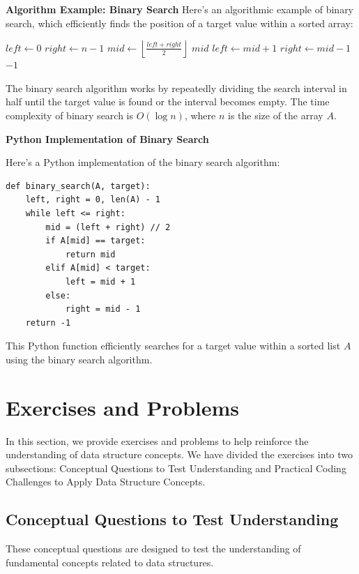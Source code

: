 \documentclass[12pt]{book} %
\begin{document}
\FloatBarrier
\textbf{Algorithm Example: Binary Search}
Here's an algorithmic example of binary search, which efficiently finds the position of a target value within a sorted array:
\FloatBarrier
\begin{algorithm}[H]
\caption{Binary Search}
\begin{algorithmic}[1]
    \State $left \gets 0$
    \State $right \gets n - 1$
        \State $mid \gets \left\lfloor \frac{left + right}{2} \right\rfloor$
            \State \Return $mid$ 
            \State $left \gets mid + 1$
        \Else
            \State $right \gets mid - 1$
        \EndIf
    \EndWhile
    \State \Return $-1$ 
\EndProcedure
\end{algorithmic}
\end{algorithm}
\FloatBarrier
The binary search algorithm works by repeatedly dividing the search interval in half until the target value is found or the interval becomes empty. The time complexity of binary search is $O(\log n)$, where $n$ is the size of the array $A$.

\FloatBarrier
\textbf{Python Implementation of Binary Search}


Here's a Python implementation of the binary search algorithm:
\FloatBarrier
\begin{lstlisting}
def binary_search(A, target):
    left, right = 0, len(A) - 1
    while left <= right:
        mid = (left + right) // 2
        if A[mid] == target:
            return mid
        elif A[mid] < target:
            left = mid + 1
        else:
            right = mid - 1
    return -1
\end{lstlisting}
\FloatBarrier
This Python function efficiently searches for a target value within a sorted list $A$ using the binary search algorithm.


\section{Exercises and Problems}
In this section, we provide exercises and problems to help reinforce the understanding of data structure concepts. We have divided the exercises into two subsections: Conceptual Questions to Test Understanding and Practical Coding Challenges to Apply Data Structure Concepts.

\subsection{Conceptual Questions to Test Understanding}
These conceptual questions are designed to test the understanding of fundamental concepts related to data structures.
\end{document}

